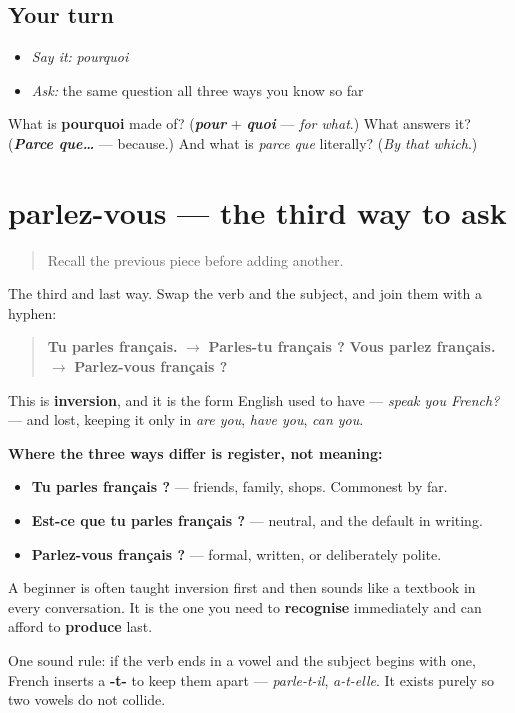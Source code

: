 \subsection*{Your turn}
\begin{itemize}
\raggedright
  \item \emph{Say it:} \emph{pourquoi}
  \item \emph{Ask:} the same question all three ways you know so far
\end{itemize}

\begin{tcolorbox}[breakable,colback=teal!4,colframe=teal!35!black,title={Before you move on}]
What is \textbf{pourquoi} made of? (\emph{\textbf{pour}} + \emph{\textbf{quoi}} — \emph{for what}.) What answers it? (\emph{\textbf{Parce que…}} — because.) And what is \emph{parce que} literally? (\emph{By that which}.)
\end{tcolorbox}
\section[parlez-vous]{parlez-vous — the third way to ask}

\label{lesson:FR-C32-inversion}



\begin{quote}
Recall the previous piece before adding another.
\end{quote}

\begin{cousinweb}
The third and last way. Swap the verb and the subject, and join them with a hyphen:

\begin{quote}
\textbf{Tu parles français.} $\to$ \textbf{Parles-tu français ?} \textbf{Vous parlez français.} $\to$ \textbf{Parlez-vous français ?}
\end{quote}

This is \textbf{inversion}, and it is the form English used to have — \emph{speak you French?} — and lost, keeping it only in \emph{are you}, \emph{have you}, \emph{can you}.

\textbf{Where the three ways differ is register, not meaning:}

\begin{itemize}
\raggedright
  \item \textbf{Tu parles français ?} — friends, family, shops. Commonest by far.
  \item \textbf{Est-ce que tu parles français ?} — neutral, and the default in writing.
  \item \textbf{Parlez-vous français ?} — formal, written, or deliberately polite.
\end{itemize}

A beginner is often taught inversion first and then sounds like a textbook in every conversation. It is the one you need to \textbf{recognise} immediately and can afford to \textbf{produce} last.

One sound rule: if the verb ends in a vowel and the subject begins with one, French inserts a \textbf{-t-} to keep them apart — \emph{parle-t-il}, \emph{a-t-elle}. It exists purely so two vowels do not collide.
\end{cousinweb}

